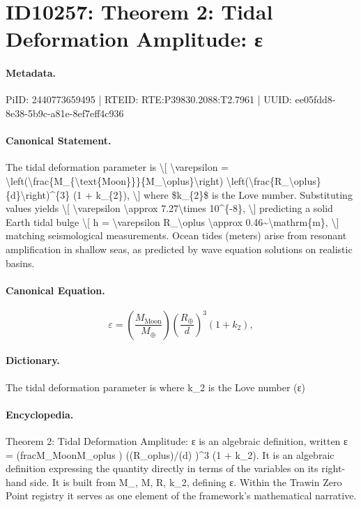 \section*{ID10257: Theorem 2: Tidal Deformation Amplitude: ε}
\paragraph{Metadata.}
PiID: 2440773659495 | RTEID: RTE:P39830.2088:T2.7961 | UUID: ee05fdd8-8e38-5b9c-a81e-8ef7eff4c936

\paragraph{Canonical Statement.}
The tidal deformation parameter is \textbackslash{}[ \textbackslash{}varepsilon = \textbackslash{}left(\textbackslash{}frac\{M\_\{\textbackslash{}text\{Moon\}\}\}\{M\_\textbackslash{}oplus\}\textbackslash{}right) \textbackslash{}left(\textbackslash{}frac\{R\_\textbackslash{}oplus\}\{d\}\textbackslash{}right)\textasciicircum{}\{3\} (1 + k\_\{2\}), \textbackslash{}] where \$k\_\{2\}\$ is the Love number. Substituting values yields \textbackslash{}[ \textbackslash{}varepsilon \textbackslash{}approx 7.27\textbackslash{}times 10\textasciicircum{}\{-8\}, \textbackslash{}] predicting a solid Earth tidal bulge \textbackslash{}[ h = \textbackslash{}varepsilon R\_\textbackslash{}oplus \textbackslash{}approx 0.46\textasciitilde{}\textbackslash{}mathrm\{m\}, \textbackslash{}] matching seismological measurements. Ocean tides (meters) arise from resonant amplification in shallow seas, as predicted by wave equation solutions on realistic basins.

\paragraph{Canonical Equation.}
\[
\varepsilon = \left(\frac{M_{\text{Moon}}}{M_\oplus}\right) \left(\frac{R_\oplus}{d}\right)^{3} (1 + k_{2}),
\]

\paragraph{Dictionary.}
The tidal deformation parameter is where k\_2 is the Love number (ε)

\paragraph{Encyclopedia.}
Theorem 2: Tidal Deformation Amplitude: ε is an algebraic definition, written ε = (fracM\_MoonM\_oplus ) ((R\_oplus)/(d) )\textasciicircum{}3 (1 + k\_2). It is an algebraic definition expressing the quantity directly in terms of the variables on its right-hand side. It is built from M\_, M, R, k\_2, defining ε. Within the Trawin Zero Point registry it serves as one element of the framework's mathematical narrative.
